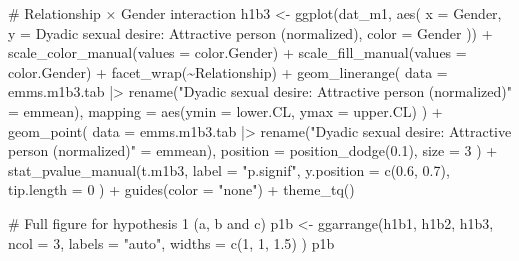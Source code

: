 \documentclass[
  bookmarksnumbered]{article}
\newenvironment{Shaded}{\begin{snugshade}}{\end{snugshade}}
\newcommand{\AttributeTok}[1]{\textcolor[rgb]{0.80,0.80,0.80}{#1}}
\newcommand{\CommentTok}[1]{\textcolor[rgb]{0.50,0.62,0.50}{#1}}
\newcommand{\DecValTok}[1]{\textcolor[rgb]{0.86,0.86,0.80}{#1}}
\newcommand{\FloatTok}[1]{\textcolor[rgb]{0.75,0.75,0.82}{#1}}
\newcommand{\FunctionTok}[1]{\textcolor[rgb]{0.94,0.94,0.56}{#1}}
\newcommand{\NormalTok}[1]{\textcolor[rgb]{0.80,0.80,0.80}{#1}}
\newcommand{\OtherTok}[1]{\textcolor[rgb]{0.94,0.94,0.56}{#1}}
\newcommand{\SpecialCharTok}[1]{\textcolor[rgb]{0.86,0.64,0.64}{#1}}
\newcommand{\StringTok}[1]{\textcolor[rgb]{0.80,0.58,0.58}{#1}}
\begin{document}
\begin{Shaded}
\begin{Highlighting}[]
\CommentTok{\# Relationship × Gender interaction}
\NormalTok{h1b3 }\OtherTok{\textless{}{-}} \FunctionTok{ggplot}\NormalTok{(dat\_m1, }\FunctionTok{aes}\NormalTok{(}
  \AttributeTok{x =}\NormalTok{ Gender, }\AttributeTok{y =} \StringTok{\textasciigrave{}}\AttributeTok{Dyadic sexual desire: Attractive person (normalized)}\StringTok{\textasciigrave{}}\NormalTok{,}
  \AttributeTok{color =}\NormalTok{ Gender}
\NormalTok{)) }\SpecialCharTok{+}
  \FunctionTok{scale\_color\_manual}\NormalTok{(}\AttributeTok{values =}\NormalTok{ color.Gender) }\SpecialCharTok{+}
  \FunctionTok{scale\_fill\_manual}\NormalTok{(}\AttributeTok{values =}\NormalTok{ color.Gender) }\SpecialCharTok{+}
  \FunctionTok{facet\_wrap}\NormalTok{(}\SpecialCharTok{\textasciitilde{}}\NormalTok{Relationship) }\SpecialCharTok{+}
  \FunctionTok{geom\_linerange}\NormalTok{(}
    \AttributeTok{data =}\NormalTok{ emms.m1b3.tab }\SpecialCharTok{|\textgreater{}}
      \FunctionTok{rename}\NormalTok{(}\StringTok{"Dyadic sexual desire: Attractive person (normalized)"} \OtherTok{=}\NormalTok{ emmean),}
    \AttributeTok{mapping =} \FunctionTok{aes}\NormalTok{(}\AttributeTok{ymin =}\NormalTok{ lower.CL, }\AttributeTok{ymax =}\NormalTok{ upper.CL)}
\NormalTok{  ) }\SpecialCharTok{+}
  \FunctionTok{geom\_point}\NormalTok{(}
    \AttributeTok{data =}\NormalTok{ emms.m1b3.tab }\SpecialCharTok{|\textgreater{}}
      \FunctionTok{rename}\NormalTok{(}\StringTok{"Dyadic sexual desire: Attractive person (normalized)"} \OtherTok{=}\NormalTok{ emmean),}
    \AttributeTok{position =} \FunctionTok{position\_dodge}\NormalTok{(}\FloatTok{0.1}\NormalTok{),}
    \AttributeTok{size =} \DecValTok{3}
\NormalTok{  ) }\SpecialCharTok{+}
  \FunctionTok{stat\_pvalue\_manual}\NormalTok{(t.m1b3,}
    \AttributeTok{label =} \StringTok{"p.signif"}\NormalTok{,}
    \AttributeTok{y.position =} \FunctionTok{c}\NormalTok{(}\FloatTok{0.6}\NormalTok{, }\FloatTok{0.7}\NormalTok{),}
    \AttributeTok{tip.length =} \DecValTok{0}
\NormalTok{  ) }\SpecialCharTok{+}
  \FunctionTok{guides}\NormalTok{(}\AttributeTok{color =} \StringTok{"none"}\NormalTok{) }\SpecialCharTok{+}
  \FunctionTok{theme\_tq}\NormalTok{()}

\CommentTok{\# Full figure for hypothesis 1 (a, b and c)}
\NormalTok{p1b }\OtherTok{\textless{}{-}} \FunctionTok{ggarrange}\NormalTok{(h1b1, h1b2, h1b3,}
  \AttributeTok{ncol =} \DecValTok{3}\NormalTok{,}
  \AttributeTok{labels =} \StringTok{"auto"}\NormalTok{,}
  \AttributeTok{widths =} \FunctionTok{c}\NormalTok{(}\DecValTok{1}\NormalTok{, }\DecValTok{1}\NormalTok{, }\FloatTok{1.5}\NormalTok{)}
\NormalTok{)}
\NormalTok{p1b}
\end{Highlighting}
\end{Shaded}
\end{document}
